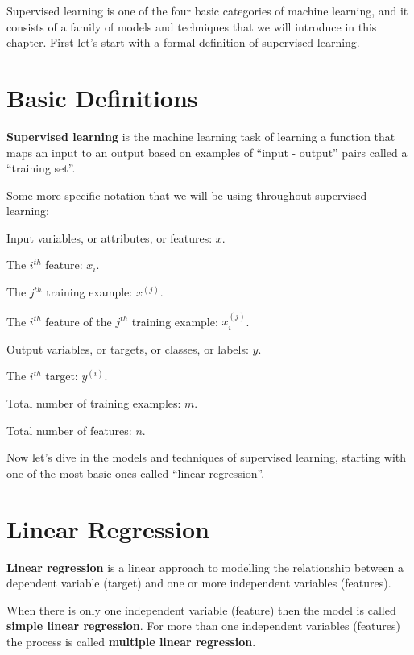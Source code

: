Supervised learning is one of the four basic categories of machine learning, and it consists of a family of models
and techniques that we will introduce in this chapter. First let's start with a formal definition of supervised
learning.

\section{Basic Definitions}

\textbf{Supervised learning} is the machine learning task of learning a function that maps an input to an output
based on examples of ``input - output'' pairs called a ``training set''.
\ed


Some more specific notation that we will be using throughout supervised learning:
\bit
\item Input variables, or attributes, or features: $x$.
\item The $i^{th}$ feature: $x_{i}$.
\item The $j^{th}$ training example: $x^{(j)}$.
\item The $i^{th}$ feature of the $j^{th}$ training example: $x_{i}^{(j)}$.
\item Output variables, or targets, or classes, or labels: $y$.
\item The $i^{th}$ target: $y^{(i)}$.
\item Total number of training examples: $m$.
\item Total number of features: $n$.
\eit

Now let's dive in the models and techniques of supervised learning, starting with one of the most basic ones called
``linear regression''.

\section{Linear Regression}

\textbf{Linear regression} is a linear approach to modelling the relationship between a dependent variable (target)
and one or more independent variables (features).
\ed

When there is only one independent variable (feature) then the model is called \textbf{simple linear regression}. For
more than one independent variables (features) the process is called \textbf{multiple linear regression}.
\ed

